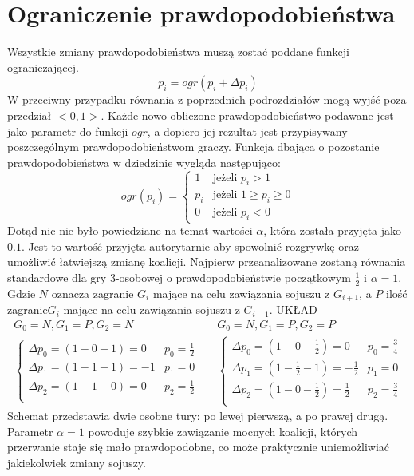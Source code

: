\section{Ograniczenie prawdopodobieństwa}
\label{sec:ograniczenie}
Wszystkie zmiany prawdopodobieństwa muszą zostać poddane funkcji ograniczającej.
\begin{equation} \label{eq:ograniczenie}
p_i = ogr( p_i + \Delta p_i)
\end{equation}
W przeciwny przypadku równania z poprzednich podrozdziałów mogą wyjść poza przedział $<0,1>$. Każde nowo obliczone prawdopodobieństwo podawane jest jako parametr do funkcji $ogr$, a dopiero jej rezultat jest przypisywany poszczególnym prawdopodobieństwom graczy. Funkcja dbająca o pozostanie prawdopodobieństwa w dziedzinie wygląda następująco:
\begin{displaymath}
ogr(p_i) = \left\{
\begin{array}{ll}
1 & \text{jeżeli } p_i > 1 \\
p_i & \text{jeżeli } 1 \geq p_i \geq 0 \\
0 & \text{jeżeli } p_i < 0
\end{array} 
\right.
\end{displaymath}
Dotąd nic nie było powiedziane na temat wartości $\alpha$, która została przyjęta jako $0.1$. Jest to wartość przyjęta autorytarnie aby spowolnić rozgrywkę oraz umożliwić łatwiejszą zmianę koalicji. Najpierw przeanalizowane zostaną równania standardowe dla gry 3-osobowej o prawdopodobieństwie początkowym $\frac{1}{2}$ i $\alpha = 1$. Gdzie $N$ oznacza zagranie $G_i$ mające na celu zawiązania sojuszu z $G_{i+1}$, a $P$ ilość zagranie$G_i$ mające na celu zawiązania sojuszu z $G_{i-1}$.
{\color{red} UKŁAD}
\begin{align*}
G_0 = N, G_1 = P, G_2 = N && G_0 = N, G_1 = P, G_2 = P\\
\left\{
\begin{array}{cc}
\Delta p_0 = (1 - 0 - 1) =  0 & p_0=\frac{1}{2}\\
\Delta p_1 = (1 - 1 - 1) =  -1 & p_1= 0\\
\Delta p_2 = (1 - 1 - 0) =  0 & p_2=\frac{1}{2}\\
\end{array} 
\right. &&
\left\{
\begin{array}{cc}
\Delta p_0 = (1 - 0 - \frac{1}{2}) =  0 & p_0=\frac{3}{4}\\
\Delta p_1 = (1 - \frac{1}{2} - 1) =  -\frac{1}{2} & p_1= 0\\
\Delta p_2 = (1 - 0 - \frac{1}{2}) =  \frac{1}{2} & p_2=\frac{3}{4}\\
\end{array}
\right.
\end{align*}
Schemat przedstawia dwie osobne tury: po lewej pierwszą, a po prawej drugą. Parametr $\alpha=1$ powoduje szybkie zawiązanie mocnych koalicji, których przerwanie staje się mało prawdopodobne, co może praktycznie uniemożliwiać jakiekolwiek zmiany sojuszy.

